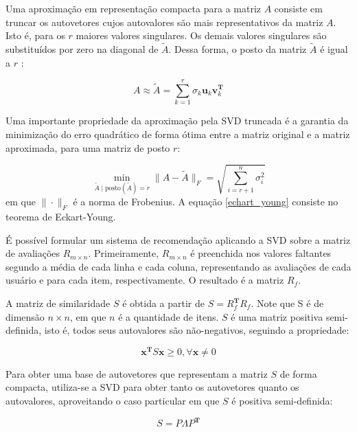 Uma aproximação em representação compacta para a matriz $A$ consiste em truncar
os autovetores cujos autovalores são mais representativos da matriz $A$. Isto é,
para os $r$ maiores valores singulares. Os demais valores singulares são
substituídos por zero na diagonal de $\tilde{A}$. Dessa forma, o posto da matriz
$\tilde{A}$ é igual a $r$ \cite{brunton2022data}:

\begin{equation}
    A \approx \tilde{A} = \sum_{k=1}^{r}\sigma_k \mathbf{u}_k \mathbf{v}_k^{\mathbf{T}}
\end{equation}

Uma importante propriedade da aproximação pela SVD truncada é a garantia da
minimização do erro quadrático de forma ótima entre a matriz original e a matriz
aproximada, para uma matriz de posto $r$:

\begin{equation} \label{echart_young}
    \min_{\tilde{A} \mid \text{posto}(\tilde{A}) = r } \|A - \tilde{A}\|_F = \sqrt{\sum_{i=r+1}^{n}\sigma_i^2}
\end{equation}
em que $\| \cdot \|_F$ é a norma de Frobenius. A equação \ref{echart_young}
consiste no teorema de Eckart-Young.


É possível formular um sistema de recomendação aplicando a SVD sobre a matriz de
avaliações $R_{m \times n}$. Primeiramente, $R_{m \times n}$ é preenchida nos
valores faltantes segundo a média de cada linha e cada coluna, representando as
avaliações de cada usuário e para cada item, respectivamente. O resultado é a
matriz $R_f$.

A matriz de similaridade $S$ é obtida a partir de $S = R_f^{\mathbf{T} }R_f$.
Note que S é de dimensão $n \times n$, em que $n$ é a quantidade de itens. $S$ é
uma matriz positiva semi-definida, isto é, todos seus autovalores são
não-negativos, seguindo a propriedade:

\begin{equation}
    \mathbf{x}^{\mathbf{T}} S \mathbf{x} \geq 0, \forall \mathbf{x} \neq 0
\end{equation}

 Para obter uma base de autovetores que representam a matriz $S$ de forma
 compacta, utiliza-se a SVD para obter tanto os autovetores quanto os
 autovalores, aproveitando o caso particular em que $S$ é positiva
 semi-definida:

\begin{equation}
    S = P \Lambda P^{\mathbf{T}}
\end{equation}

